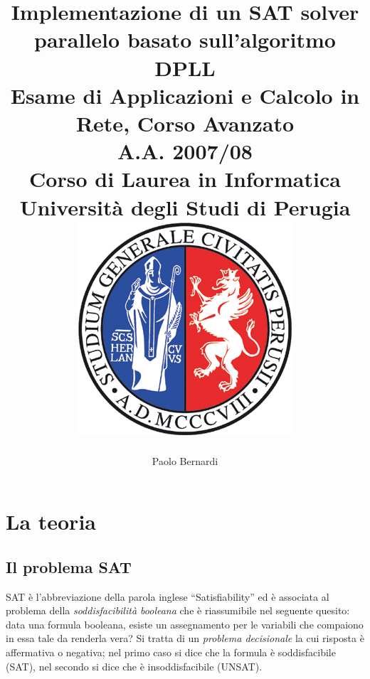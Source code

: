 \documentclass[12pt, a4paper, twosides]{report}
\begin{document}
\title{\null {}
  \Huge{Implementazione di un SAT solver parallelo basato sull'algoritmo DPLL}
  \\[\baselineskip]
  \Large{Esame di Applicazioni e Calcolo in Rete, Corso Avanzato\\
         A.A. 2007/08\\
         [\baselineskip]
         Corso di Laurea in Informatica\\Università degli Studi di Perugia}\\
  [\baselineskip]
  \includegraphics[width=.3\textwidth]{unipg.png}\\[\baselineskip]
 \null}
\author{Paolo Bernardi}

\maketitle
\thispagestyle{empty}
\newpage

\setlength{\parskip}{0.5em}
\setlength{\parindent}{0em}


\tableofcontents

\chapter{La teoria}

\section{Il problema SAT}

SAT è l'abbreviazione della parola inglese “Satisfiability” ed è associata al problema della \textit{soddisfacibilità booleana} che è riassumibile nel seguente quesito: data una formula booleana, esiste un assegnamento per le variabili che compaiono in essa tale da renderla vera? Si tratta di un \textit{problema decisionale} la cui risposta è affermativa o negativa; nel primo caso si dice che la formula è soddisfacibile (SAT), nel secondo si dice che è insoddisfacibile (UNSAT).
\end{document}
